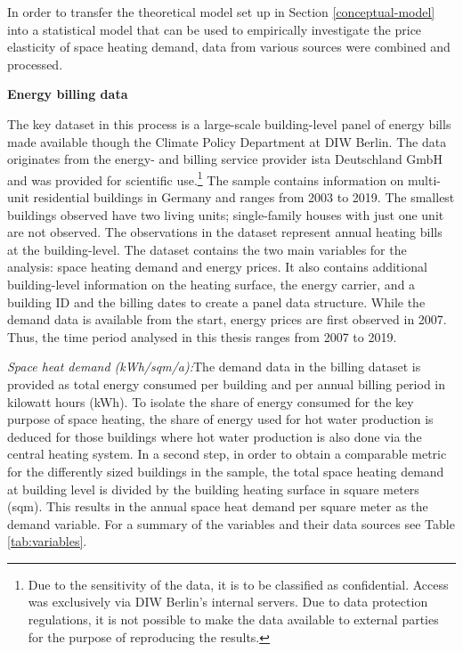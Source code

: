 \documentclass[12pt,twoside]{reedthesis}
\begin{document}
In order to transfer the theoretical model set up in Section \ref{conceptual-model} into a statistical model that can be used to empirically investigate the price elasticity of space heating demand, data from various sources were combined and processed.

\textbf{Energy billing data}

The key dataset in this process is a large-scale building-level panel of energy bills made available though the Climate Policy Department at DIW Berlin. The data originates from the energy- and billing service provider ista Deutschland GmbH and was provided for scientific use.\footnote{Due to the sensitivity of the data, it is to be classified as confidential. Access was exclusively via DIW Berlin's internal servers. Due to data protection regulations, it is not possible to make the data available to external parties for the purpose of reproducing the results.} The sample contains information on multi-unit residential buildings in Germany and ranges from 2003 to 2019. The smallest buildings observed have two living units; single-family houses with just one unit are not observed. The observations in the dataset represent annual heating bills at the building-level. The dataset contains the two main variables for the analysis: space heating demand and energy prices. It also contains additional building-level information on the heating surface, the energy carrier, and a building ID and the billing dates to create a panel data structure. While the demand data is available from the start, energy prices are first observed in 2007. Thus, the time period analysed in this thesis ranges from 2007 to 2019.

\emph{Space heat demand (kWh/sqm/a):}The demand data in the billing dataset is provided as total energy consumed per building and per annual billing period in kilowatt hours (kWh). To isolate the share of energy consumed for the key purpose of space heating, the share of energy used for hot water production is deduced for those buildings where hot water production is also done via the central heating system. In a second step, in order to obtain a comparable metric for the differently sized buildings in the sample, the total space heating demand at building level is divided by the building heating surface in square meters (sqm). This results in the annual space heat demand per square meter as the demand variable. For a summary of the variables and their data sources see Table \ref{tab:variables}.
\end{document}
